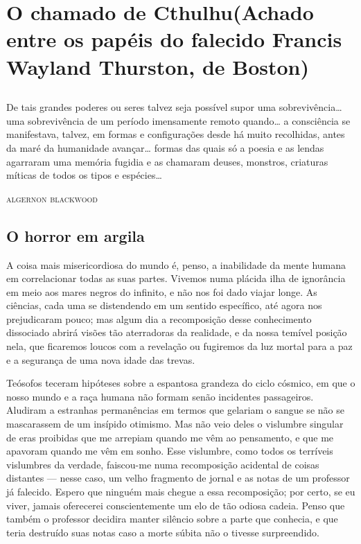 \part[o chamado de cthulhu]{O chamado de Cthulhu\break\normalsize (Achado entre os papéis do falecido Francis Wayland Thurston, de Boston)}


\chapter*{}
\thispagestyle{empty}

\vspace*{\fill}
\epigraph{De tais grandes poderes ou seres talvez seja possível supor uma
sobrevivência\ldots{} uma sobrevivência de um período imensamente remoto
quando\ldots{} a consciência se manifestava, talvez, em formas e
configurações desde há muito recolhidas, antes da maré da humanidade
avançar\ldots{} formas das quais só a poesia e as lendas agarraram uma
memória fugidia e as chamaram deuses, monstros, criaturas míticas de
todos os tipos e espécies\ldots{}}{\textsc{algernon blackwood}\footnotemark
}



\chapter{O horror em argila}


\noindent{}A coisa mais misericordiosa do mundo é, penso, a inabilidade da mente
humana em correlacionar todas as suas partes. Vivemos numa plácida ilha
de ignorância em meio aos mares negros do infinito, e não nos foi dado
viajar longe. As ciências, cada uma se distendendo em um sentido
específico, até agora nos prejudicaram pouco; mas algum dia a
recomposição desse conhecimento dissociado abrirá visões tão aterradoras
da realidade, e da nossa temível posição nela, que ficaremos loucos com
a revelação ou fugiremos da luz mortal para a paz e a segurança de uma
nova idade das trevas.

Teósofos teceram hipóteses sobre a espantosa grandeza do ciclo cósmico,
em que o nosso mundo e a raça humana não formam senão incidentes
passageiros. Aludiram a estranhas permanências em termos que gelariam o
sangue se não se mascarassem de um insípido otimismo. Mas não veio deles
o vislumbre singular de eras proibidas que me arrepiam quando me vêm ao
pensamento, e que me apavoram quando me vêm em sonho. Esse vislumbre,
como todos os terríveis vislumbres da verdade, faiscou-me numa
recomposição acidental de coisas distantes --- nesse caso, um velho
fragmento de jornal e as notas de um professor já falecido. Espero que
ninguém mais chegue a essa recomposição; por certo, se eu viver, jamais
oferecerei conscientemente um elo de tão odiosa cadeia. Penso que também
o professor decidira manter silêncio sobre a parte que conhecia, e que
teria destruído suas notas caso a morte súbita não o tivesse
surpreendido.

